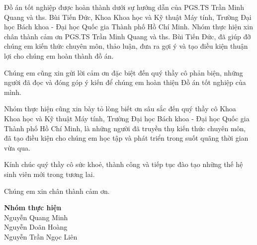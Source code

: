 Đồ án tốt nghiệp được hoàn thành dưới sự hướng dẫn  của PGS.TS Trần Minh Quang và \acrshort{ths}. Bùi Tiến Đức, Khoa Khoa học và Kỹ thuật Máy tính, Trường Đại học Bách khoa - Đại học Quốc gia Thành phố Hồ Chí Minh. Nhóm thực hiện xin chân thành cảm ơn PGS.TS Trần Minh Quang và \acrshort{ths}. Bùi Tiến Đức, đã giúp đỡ chúng em kiến thức chuyên môn, thảo luận, đưa ra gợi ý và tạo điều kiện thuận lợi cho chúng em hoàn thành đồ án.



Chúng em cũng xin gửi lời cảm ơn đặc biệt đến quý thầy cô phản biện, những người đã đọc và đóng góp ý kiến để chúng em hoàn thiện Đồ án tốt nghiệp của mình.


Nhóm thực hiện cũng xin bày tỏ lòng biết ơn sâu sắc đến quý thầy cô Khoa Khoa học và Kỹ thuật Máy tính, Trường Đại học Bách khoa - Đại học Quốc gia Thành phố Hồ Chí Minh, là những người đã truyền thụ kiến thức chuyên môn, đã tạo điều kiện cho chúng em học tập và phát triển trong suốt quãng thời gian vừa qua.

Kính chúc quý thầy cô sức khoẻ, thành công và tiếp tục đào tạo những thế hệ sinh viên mới trong tương lai.


Chúng em xin chân thành cảm ơn.



\begin{flushright}
    \textbf{Nhóm thực hiện}\\
    Nguyễn Quang Minh \\
    Nguyễn Doãn Hoàng \\
    Nguyễn Trần Ngọc Liên \\
\end{flushright}